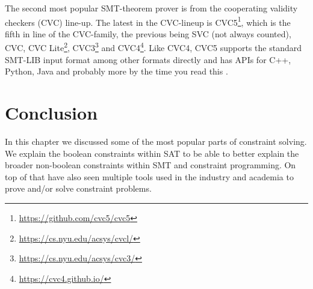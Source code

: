 The second most popular SMT-theorem prover is from the cooperating validity checkers (CVC) line-up. The latest in the CVC-lineup is CVC5\footnote{\url{https://github.com/cvc5/cvc5}}, which is the fifth in line of the CVC-family, the previous being SVC (not always counted), CVC, 
CVC Lite\footnote{\url{https://cs.nyu.edu/acsys/cvcl/}}, 
CVC3\footnote{\url{https://cs.nyu.edu/acsys/cvc3/}}\cite{71barrett2007cvc3} and 
CVC4\footnote{\url{https://cvc4.github.io/}}.
Like CVC4, CVC5 supports the standard SMT-LIB input format among other formats directly and has APIs for C++, Python, Java and probably more by the time you read this \cite{62barrettcvc5, 63barbosa2022cvc5}.

\section{Conclusion}
\label{CS:conclusion}
In this chapter we discussed some of the most popular parts of constraint solving. We explain the boolean constraints within SAT to be able to better explain the broader non-boolean constraints within SMT and constraint programming. On top of that have also seen multiple tools used in the industry and academia to prove and/or solve constraint problems.


